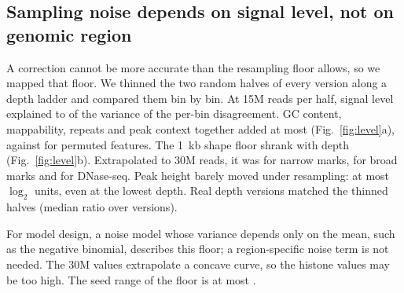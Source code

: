 \documentclass[pdflatex,sn-mathphys-num]{sn-jnl}
\newcommand{\lit}[1]{#1}
\begin{document}
\subsection{Sampling noise depends on signal level, not on genomic region}\label{sec:r3}

A correction cannot be more accurate than the resampling floor allows, so we mapped that
floor. We thinned the two random halves of every version along a depth ladder and compared
them bin by bin. At \lit{15}M reads per half, signal level explained \lvlFifteenLo{} to
\lvlFifteenHi{} of the variance of the per-bin disagreement. GC content, mappability, repeats
and peak context together added at most \featMaxFifteen{} (Fig.~\ref{fig:level}a), against
\shufMax{} for permuted features. The \lit{1}~kb shape floor shrank with depth
(Fig.~\ref{fig:level}b). Extrapolated to \lit{30}M reads, it was \shThirtyNar{} for narrow marks,
\shThirtyBr{} for broad marks and \shThirtyDn{} for DNase-seq. Peak height barely moved under
resampling: at most \peakFloorAll{} $\log_{\lit{2}}$ units, even at the lowest depth. Real depth
versions matched the thinned halves (median ratio \realRead{} over \realN{} versions).

For model design, a noise model whose variance depends only on the mean, such as the negative
binomial, describes this floor; a region-specific noise term is not needed. The
\lit{30}M values extrapolate a concave curve, so the histone values may be too high. The seed
range of the floor is at most \shSpreadHi{}.
\end{document}
